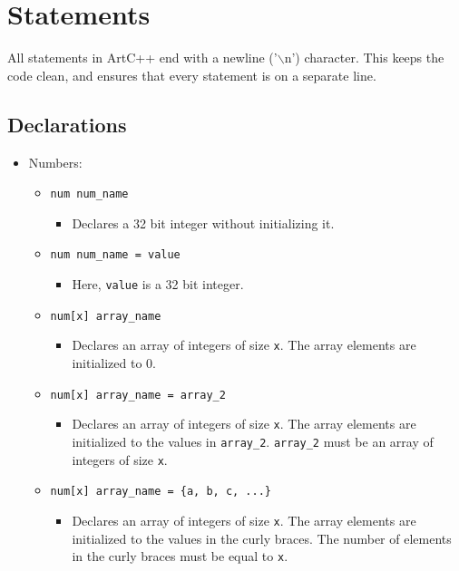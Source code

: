 \documentclass[a4paper, 11pt]{article}
\begin{document}
\section{Statements}
    All statements in ArtC++ end with a newline ('$\backslash$n') character. This keeps the code clean, and ensures that every statement is on a separate line.
    \subsection{Declarations}
      \begin{itemize}
        
        \item Numbers:
            \begin{itemize}
              \item \texttt{num num\_name} 
              \begin{itemize}
                \item Declares a 32 bit integer without initializing it.
              \end{itemize}
              \item \texttt{num num\_name = value} 
              \begin{itemize}
                \item Here, \texttt{value} is a 32 bit integer. 
              \end{itemize}
              \item \texttt{num[x] array\_name}
              \begin{itemize}
                \item Declares an array of integers of size \texttt{x}. The array elements are initialized to 0.
              \end{itemize}
              \item \texttt{num[x] array\_name = array\_2}
              \begin{itemize}
                \item Declares an array of integers of size \texttt{x}. The array elements are initialized to the values in \texttt{array\_2}. \texttt{array\_2} must be an array of integers of size \texttt{x}.
              \end{itemize}
              \item \texttt{num[x] array\_name = \{a, b, c, ...\}}   
              \begin{itemize}
                \item Declares an array of integers of size \texttt{x}. The array elements are initialized to the values in the curly braces. The number of elements in the curly braces must be equal to \texttt{x}.

\end{itemize}
\end{itemize}
\end{itemize}
\end{document}
